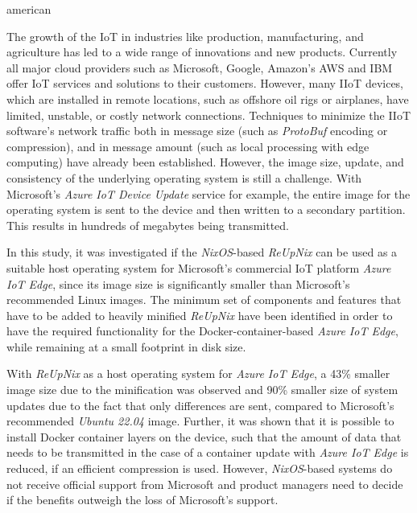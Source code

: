 \begin{otherlanguage*}{american}

The growth of the \ac{IoT} in industries like production, manufacturing, and
agriculture has led to a wide range of innovations and new products. Currently
all major cloud providers such as Microsoft, Google, Amazon's AWS and IBM offer
\ac{IoT} services and solutions to their customers. However, many \ac{IIoT} devices,
which are installed in remote locations, such as offshore oil rigs or airplanes,
have limited, unstable, or costly network connections. Techniques to
minimize the \ac{IIoT} software's network traffic both in message size
(such as \textit{ProtoBuf} encoding or compression), and in message amount
(such as local processing with edge computing) have already been established.
However, the image size, update, and consistency of the underlying operating
system is still a challenge. With Microsoft's \textit{Azure IoT Device
Update} service for example, the entire image for the operating system is sent
to the device and then written to a secondary partition. This results in hundreds
of megabytes being transmitted.

In this study, it was investigated if the \textit{NixOS}-based \textit{ReUpNix}
can be used as a suitable host operating system for Microsoft's commercial
\ac{IoT} platform \textit{Azure IoT Edge}, since its image size is significantly
smaller than Microsoft's recommended Linux images.
The  minimum set of components and features that have to be added to heavily
minified \textit{ReUpNix} have been identified in order to have the required
functionality for the
Docker-container-based \textit{Azure IoT Edge}, while remaining at a small
footprint in disk size.

With \textit{ReUpNix} as a host operating system for \textit{Azure IoT Edge}, a
43\% smaller image size due to the minification was observed and 90\% smaller size of
system updates due to the fact that only differences are sent, compared to
Microsoft's recommended \textit{Ubuntu 22.04} image.
Further, it was shown that it is possible to install Docker container
layers on the device, such that the amount of data that needs to be transmitted
in the case of a container update with \textit{Azure IoT Edge} is reduced, if
an efficient compression is used.
However, \textit{NixOS}-based systems do not receive official support from
Microsoft and product managers need to decide if the benefits outweigh the loss
of Microsoft's support.

\end{otherlanguage*}


